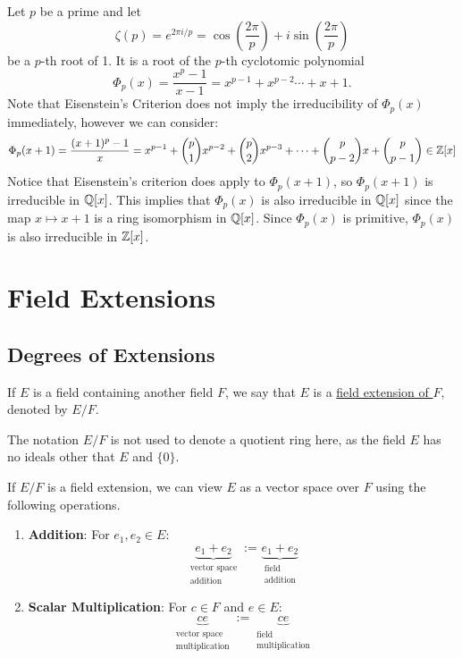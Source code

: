 \documentclass[11pt]{article}
\begin{document}
\begin{example}
    Let $p$ be a prime and let
    \[\zeta(p)=e^{2\pi i/p}=\cos\left(\frac{2\pi}{p}\right)+i\sin\left(\frac{2\pi}{p}\right)\]
    be a $p$-th root of 1. It is a root of the $p$-th cyclotomic polynomial
    \[\Phi_p(x)=\frac{x^p-1}{x-1}=x^{p-1}+x^{p-2}\cdots+x+1.\]
    Note that Eisenstein's Criterion does not imply the irreducibility of $\Phi_p(x)$ immediately, however we can consider:
    \[\Phi_p(x+1)=\frac{(x+1)^p-1}{x}=x^{p-1}+\binom{p}{1}x^{p-2}+\binom{p}{2}x^{p-3}+\cdots+\binom{p}{p-2}x+\binom{p}{p-1}\in\mathbb{Z}[x]\]
    Notice that Eisenstein's criterion does apply to $\Phi_p(x+1)$, so $\Phi_p(x+1)$ is irreducible in $\mathbb{Q}[x]$. This implies that $\Phi_p(x)$ is also irreducible in $\mathbb{Q}[x]$ since the map $x\mapsto x+1$ is a ring isomorphism in $\mathbb{Q}[x]$. Since $\Phi_p(x)$ is primitive, $\Phi_p(x)$ is also irreducible in $\mathbb{Z}[x]$.
\end{example}

\pagebreak

\section{Field Extensions}

\subsection{Degrees of Extensions}

\begin{definition}
    If $E$ is a field containing another field $F$, we say that $E$ is a \ul{field extension of $F$}, denoted by $E/F$.
\end{definition}

\begin{remark}
    The notation $E/F$ is not used to denote a quotient ring here, as the field $E$ has no ideals other that $E$ and $\{0\}$.
\end{remark}

\begin{notation}
    If $E/F$ is a field extension, we can view $E$ as a vector space over $F$ using the following operations.
    \begin{enumerate}
        \item\textbf{Addition}: For $e_1,e_2\in E$:
        $$\underbrace{e_1+e_2}_{\substack{\text{vector space} \\ \text{addition}}}:=\underbrace{e_1+e_2}_{\substack{\text{field} \\ \text{addition}}}$$
        \item\textbf{Scalar Multiplication}: For $c\in F$ and $e\in E$:
        $$\underbrace{ce}_{\substack{\text{vector space} \\ \text{multiplication}}}:=\underbrace{ce}_{\substack{\text{field} \\ \text{multiplication}}}$$
    \end{enumerate}
\end{notation}
\end{document}
